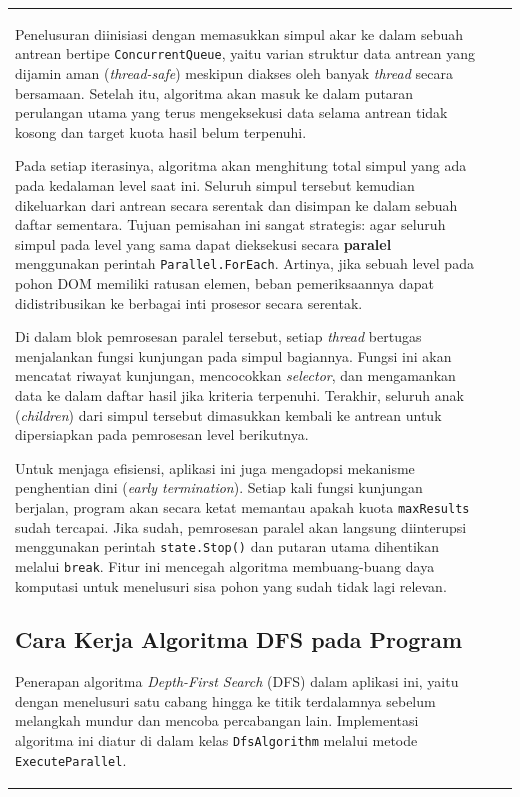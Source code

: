 \documentclass[12pt]{article}
\begin{document}
\begin{table}[H]
\begin{tabular}{|l|c|c|}
\begin{document}
Penelusuran diinisiasi dengan memasukkan simpul akar ke dalam sebuah antrean bertipe \texttt{ConcurrentQueue}, yaitu varian struktur data antrean yang dijamin aman (\textit{thread-safe}) meskipun diakses oleh banyak \textit{thread} secara bersamaan. Setelah itu, algoritma akan masuk ke dalam putaran perulangan utama yang terus mengeksekusi data selama antrean tidak kosong dan target kuota hasil belum terpenuhi.

Pada setiap iterasinya, algoritma akan menghitung total simpul yang ada pada kedalaman level saat ini. Seluruh simpul tersebut kemudian dikeluarkan dari antrean secara serentak dan disimpan ke dalam sebuah daftar sementara. Tujuan pemisahan ini sangat strategis: agar seluruh simpul pada level yang sama dapat dieksekusi secara \textbf{paralel} menggunakan perintah \texttt{Parallel.ForEach}. Artinya, jika sebuah level pada pohon DOM memiliki ratusan elemen, beban pemeriksaannya dapat didistribusikan ke berbagai inti prosesor secara serentak.

Di dalam blok pemrosesan paralel tersebut, setiap \textit{thread} bertugas menjalankan fungsi kunjungan pada simpul bagiannya. Fungsi ini akan mencatat riwayat kunjungan, mencocokkan \textit{selector}, dan mengamankan data ke dalam daftar hasil jika kriteria terpenuhi. Terakhir, seluruh anak (\textit{children}) dari simpul tersebut dimasukkan kembali ke antrean untuk dipersiapkan pada pemrosesan level berikutnya.

Untuk menjaga efisiensi, aplikasi ini juga mengadopsi mekanisme penghentian dini (\textit{early termination}). Setiap kali fungsi kunjungan berjalan, program akan secara ketat memantau apakah kuota \texttt{maxResults} sudah tercapai. Jika sudah, pemrosesan paralel akan langsung diinterupsi menggunakan perintah \texttt{state.Stop()} dan putaran utama dihentikan melalui \texttt{break}. Fitur ini mencegah algoritma membuang-buang daya komputasi untuk menelusuri sisa pohon yang sudah tidak lagi relevan.

\subsection{Cara Kerja Algoritma DFS pada Program}

Penerapan algoritma \textit{Depth-First Search} (DFS) dalam aplikasi ini, yaitu dengan menelusuri satu cabang hingga ke titik terdalamnya sebelum melangkah mundur dan mencoba percabangan lain. Implementasi algoritma ini diatur di dalam kelas \texttt{DfsAlgorithm} melalui metode \texttt{ExecuteParallel}.


\end{document}
\end{tabular}
\end{table}
\end{document}
